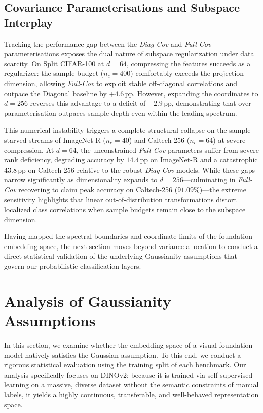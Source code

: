 \subsection{Covariance Parameterisations and Subspace Interplay}
\label{sec:pca_covariance_interplay}

Tracking the performance gap between the \emph{Diag-Cov} and \emph{Full-Cov} parameterisations exposes the dual nature of subspace regularization under data scarcity. On Split CIFAR-100 at $d=64$, compressing the features succeeds as a regularizer: the sample budget ($n_c=400$) comfortably exceeds the projection dimension, allowing \emph{Full-Cov} to exploit stable off-diagonal correlations and outpace the Diagonal baseline by $+4.6$\,pp. However, expanding the coordinates to $d=256$ reverses this advantage to a deficit of $-2.9$\,pp, demonstrating that over-parameterisation outpaces sample depth even within the leading spectrum. 

This numerical instability triggers a complete structural collapse on the sample-starved streams of ImageNet-R ($n_c=40$) and Caltech-256 ($n_c=64$) at severe compression. At $d=64$, the unconstrained \emph{Full-Cov} parameters suffer from severe rank deficiency, degrading accuracy by $14.4$\,pp on ImageNet-R and a catastrophic $43.8$\,pp on Caltech-256 relative to the robust \emph{Diag-Cov} models. While these gaps narrow significantly as dimensionality expands to $d=256$---culminating in \emph{Full-Cov} recovering to claim peak accuracy on Caltech-256 ($91.09\%$)---the extreme sensitivity highlights that linear out-of-distribution transformations distort localized class correlations when sample budgets remain close to the subspace dimension.

Having mapped the spectral boundaries and coordinate limits of the foundation embedding space, the next section moves beyond variance allocation to conduct a direct statistical validation of the underlying Gaussianity assumptions that govern our probabilistic classification layers.

\section{Analysis of Gaussianity Assumptions}
\label{sec:gaussianity_results}

In this section, we examine whether the embedding space of a visual foundation model natively satisfies the Gaussian assumption. To this end, we conduct a rigorous statistical evaluation using the training split of each benchmark. Our analysis specifically focuses on DINOv2; because it is trained via self-supervised learning on a massive, diverse dataset without the semantic constraints of manual labels, it yields a highly continuous, transferable, and well-behaved representation space.

